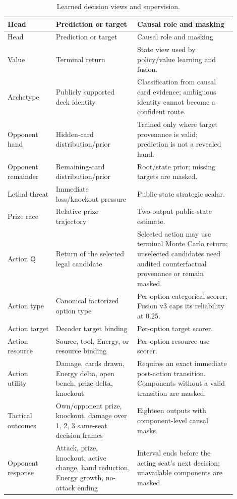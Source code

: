 \documentclass[10pt]{article}
\begin{document}
\small
\begin{longtable}{>{\raggedright\arraybackslash}p{0.19\linewidth}>{\raggedright\arraybackslash}p{0.32\linewidth}>{\raggedright\arraybackslash}p{0.39\linewidth}}
\caption{Learned decision views and supervision.}\label{tab:heads}\\
\toprule
Head & Prediction or target & Causal role and masking \\
\midrule
\endfirsthead
\toprule
Head & Prediction or target & Causal role and masking \\
\midrule
\endhead
Value & Terminal return & State view used by policy/value learning and fusion. \\
Archetype & Publicly supported deck identity & Classification from causal card evidence; ambiguous identity cannot become a confident route. \\
Opponent hand & Hidden-card distribution/prior & Trained only where target provenance is valid; prediction is not a revealed hand. \\
Opponent remainder & Remaining-card distribution/prior & Root/state prior; missing targets are masked. \\
Lethal threat & Immediate loss/knockout pressure & Public-state strategic scalar. \\
Prize race & Relative prize trajectory & Two-output public-state estimate. \\
Action Q & Return of the selected legal candidate & Selected action may use terminal Monte Carlo return; unselected candidates need audited counterfactual provenance or remain masked. \\
Action type & Canonical factorized option type & Per-option categorical scorer; Fusion v3 caps its reliability at 0.25. \\
Action target & Decoder target binding & Per-option target scorer. \\
Action resource & Source, tool, Energy, or resource binding & Per-option resource-use scorer. \\
Action utility & Damage, cards drawn, Energy delta, open bench, prize delta, knockout & Requires an exact immediate post-action transition. Components without a valid transition are masked. \\
Tactical outcomes & Own/opponent prize, knockout, damage over 1, 2, 3 same-seat decision frames & Eighteen outputs with component-level causal masks. \\
Opponent response & Attack, prize, knockout, active change, hand reduction, Energy growth, no-attack ending & Interval ends before the acting seat's next decision; unavailable components are masked. \\

\end{longtable}
\end{document}
